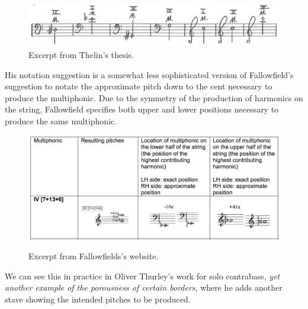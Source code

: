 \begin{figure}
    \includegraphics[width=\linewidth]{./resources/thelinMultiphonicNotation.png}
    \caption{Excerpt from Thelin's thesis.}
  \label{fig:Excerpt from Thelin's thesis}
  \end{figure}
His notation suggestion is a somewhat less sophisticated version of Fallowfield's suggestion to notate the approximate pitch down to the cent necessary to produce the multiphonic. 
Due to the symmetry of the production of harmonics on the string, Fallowfield specifies both upper and lower positions necessary to produce the same multiphonic.\autocite[index/the-string/multiphonics-and-other-multiple-sounds/fingeringcharts.html]{fallowfieldCelloMap}
\begin{figure}
    \includegraphics[width=\linewidth]{./resources/fallowfieldMultiphonicFingering.png}
    \caption{Excerpt from Fallowfields's website.}\autocite[]{fallowfieldCelloMap}
\label{fig:Excerpt from Fallowfields's website}
  \end{figure}

  We can see this in practice in Oliver Thurley's work for solo contrabass, \emph{yet another example of the porousness of certain borders}, where he adds another stave showing the intended pitches to be produced.\autocite{thurleyAnotherExamplePorousness2014}

